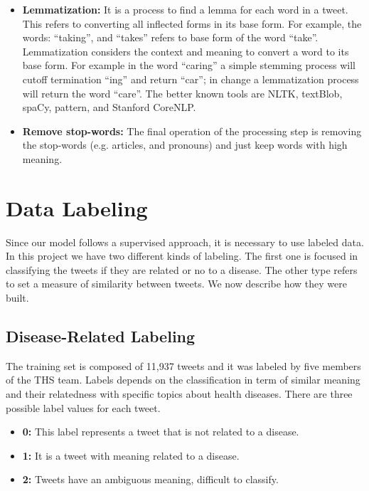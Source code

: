 \documentclass[12pt]{report}
\begin{document}
\begin{itemize}[nolistsep]
	\item \textbf{Lemmatization:} It is a process to find a lemma for each word in a tweet. This refers to converting all inflected forms in its base form. For example, the words: ``taking'', and ``takes'' refers to base form of the word ``take''. Lemmatization considers the context and meaning to convert a word to its base form. For example in the word ``caring'' a simple stemming process will cutoff termination ``ing'' and return ``car''; in change a lemmatization process will return the word ``care''. %
	The better known tools are \ac{NLTK}, textBlob, spaCy, pattern, and Stanford CoreNLP. 

	\item \textbf{Remove stop-words:} The final operation of the processing step is removing the stop-words (e.g. articles, and pronouns) and just keep words with high meaning.
\end{itemize}

\section{Data Labeling} \label{data_labeling}

Since our model follows a supervised approach, it is necessary to use labeled data. In this project we have two different kinds of labeling. The first one is focused in classifying the tweets if they are related or no to a disease. The other type refers to set a measure of similarity between tweets. We now describe how they were built.

\subsection{Disease-Related Labeling}

The training set is composed of 11,937 tweets and it was labeled by five members of the \ac{THS} team. Labels depends on the classification in term of similar meaning and their relatedness with specific topics about health diseases. There are three possible label values for each tweet. 

\begin{itemize} [nolistsep]
	\item \textbf{0:} This label represents a tweet that is not related to a disease. 
	\item \textbf{1:} It is a tweet with meaning  related to a disease.
	\item \textbf{2:} Tweets have an ambiguous meaning, difficult to classify.
\end{itemize}
\end{document}
